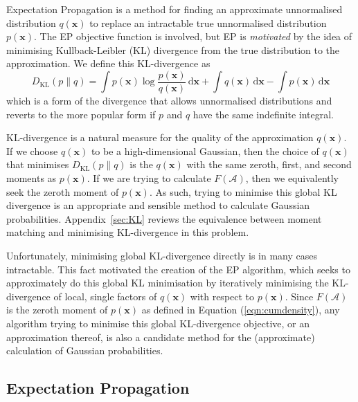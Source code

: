 \documentclass[twoside,11pt]{article}
\def\x{{\mathbf x}}
\def\regionA{\mathcal{A}}
\renewcommand{\d}{\,\mathrm{d}}
\newcommand{\KL}{\text{KL}}
\begin{document}
Expectation Propagation \cite[]{minka01phd, minkaUAI01,minkaMSFTTR2005, opperTAP2000} is a method for finding an approximate unnormalised distribution $q(\x)$ to replace an intractable true unnormalised distribution $p(\x)$. The EP objective function is involved, but EP is \emph{motivated} by the idea of minimising Kullback-Leibler (KL) divergence \cite[]{CoverandThomas} from the true distribution to the approximation. We define this KL-divergence as 
\begin{equation}
  \label{eq:1}
  D_\KL(p \| q) = \int p(\x) \log \frac{p(\x)}{q(\x)} \d \x + \int q(\x) \d \x -
  \int p(\x) \d \x
\end{equation}
which is a form of the divergence that allows unnormalised distributions and reverts to the more popular form if $p$ and $q$ have the same indefinite integral. 

KL-divergence is a natural measure for the
quality of the approximation $q(\x)$.  If we choose $q(\x)$ to be
a high-dimensional Gaussian, then the choice of $q(\x)$ that
minimises $D_\KL(p \parallel q)$ is
the $q(\x)$ with the same zeroth, first, and
second moments as $p(\x)$.  If we are trying
to calculate $F(\regionA)$, then we
equivalently seek the zeroth moment of $p(\x)$.  As such, trying to minimise this global KL
divergence is an appropriate and sensible method to calculate Gaussian probabilities.  Appendix~\ref{sec:KL} reviews the equivalence between moment matching and minimising KL-divergence in this problem. 

 Unfortunately, minimising
global KL-divergence directly is in many cases intractable.  This
fact motivated the creation of the EP algorithm, which seeks to approximately do
this global KL minimisation by
iteratively minimising the KL-divergence of local, single factors
of $q(\x)$ with respect to $p(\x)$.  Since $F(\regionA)$ is the zeroth moment of $p(\x)$ as defined in Equation (\ref{eqn:cumdensity}), any algorithm trying to minimise this global KL-divergence objective, or an approximation thereof, is also a candidate method for the (approximate) calculation of Gaussian probabilities.







\subsection{Expectation Propagation}
\label{sec:expect-prop}
\end{document}
